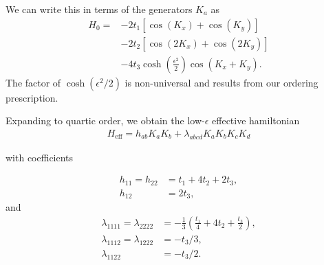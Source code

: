 \documentclass[aps,prb,twocolumn,letterpaper,twoside,nobalancelastpage,groupedaddress,amsmath,amssymb,floatfix,citeautoscript]{revtex4-1}
\begin{document}
We can write this in terms of the generators $K_a$ as
\begin{align*}
H_0 = &-2t_1 \left[\cos\left(K_x\right) + \cos\left(K_y\right)\right]\\ &-2t_2 \left[\cos\left(2K_x\right)+\cos\left(2K_y\right)\right]\\ &- 4t_3 \cosh\left(\frac{\epsilon^2}{2}\right)\cos\left(K_x + K_y\right).
\end{align*}
The factor of $\cosh(\epsilon^2/2)$ is non-universal and results from our ordering prescription.

Expanding to quartic order, we obtain the low-$\epsilon$ effective hamiltonian
\begin{align*}
H_{\text{eff}} = h_{ab}K_a K_b + \lambda_{abcd} K_a K_b K_c K_d 
\end{align*}

with coefficients

\begin{align*}
h_{11} = h_{22} &= t_1 + 4t_2 + 2t_3,\\
h_{12} &= 2t_3,
\end{align*}
and 
\begin{align*}
\lambda_{1111} = \lambda_{2222} &= -\frac{1}{3}\left(\frac{t_1}{4} + 4t_2 + \frac{t_3}{2} \right),\\
\lambda_{1112}  = \lambda_{1222} &= -t_3/3,\\
\lambda_{1122} &= -t_3/2.
\end{align*}
\end{document}
